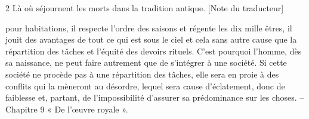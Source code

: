 2 Là où séjournent les morts dans la tradition antique. [Note du traducteur]
 
pour habitations, il respecte l’ordre des saisons et régente les dix mille êtres, il jouit des avantages de tout ce qui est sous le ciel et cela sans autre cause que la répartition des tâches et l’équité des devoirs rituels. C’est pourquoi l’homme, dès sa naissance, ne peut faire autrement que de s’intégrer à une société. Si cette société ne procède pas à une répartition des tâches, elle sera en proie à des conflits qui la mèneront au désordre, lequel sera cause d’éclatement, donc de faiblesse et, partant, de l’impossibilité d’assurer sa prédominance sur les choses.
-- Chapitre 9 « De l’œuvre royale ».
